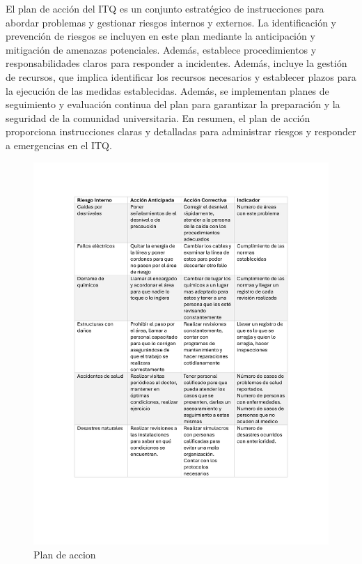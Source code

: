     El plan de acción del ITQ es un conjunto estratégico de instrucciones para abordar problemas y gestionar riesgos internos y externos. La identificación y prevención de riesgos se incluyen en este plan mediante la anticipación y mitigación de amenazas potenciales. Además, establece procedimientos y responsabilidades claros para responder a incidentes. Además, incluye la gestión de recursos, que implica identificar los recursos necesarios y establecer plazos para la ejecución de las medidas establecidas. Además, se implementan planes de seguimiento y evaluación continua del plan para garantizar la preparación y la seguridad de la comunidad universitaria. En resumen, el plan de acción proporciona instrucciones claras y detalladas para administrar riesgos y responder a emergencias en el ITQ. 
    \begin{figure}[H]
        \centering
        \includegraphics[scale=0.3]{13/img/planDeAccion.pdf}
        \caption{Plan de accion }
    \end{figure}
